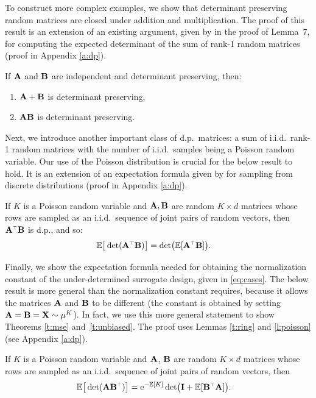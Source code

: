 \documentclass[11pt]{article}
\begin{document}
\noindent
To construct more complex examples, we show that determinant preserving random matrices are
closed under addition and multiplication. The proof of this result is
an extension of an existing argument, given by
\cite{determinantal-averaging} in the proof of Lemma~7, for computing
the expected determinant of the sum of rank-1 random matrices (proof in Appendix \ref{a:dp}).
\begin{lemma}\label{t:ring}
  If $\mathbf A$ and $\mathbf B$ are independent and determinant preserving, then:
  \vspace{-1mm}
  \begin{enumerate}
    \item $\mathbf A+\mathbf B$ is determinant preserving,
          \vspace{-2mm}
    \item $\mathbf A\mathbf B$ is determinant preserving.
  \end{enumerate}
\end{lemma}

\noindent
Next, we introduce another important class of d.p.~matrices:
a sum of i.i.d.~rank-1 random matrices with the number of
i.i.d.~samples being a Poisson random variable. Our use of the Poisson
distribution is crucial for the below result to hold. It is an
extension of an expectation formula given by \cite{dpp-intermediate}
for sampling from discrete distributions (proof in Appendix \ref{a:dp}).
\begin{lemma}\label{l:poisson}
  If $K$ is a Poisson random variable and $\mathbf A,\mathbf B$ are random $K\times d$
  matrices whose rows  are sampled as an i.i.d.~sequence of joint pairs of
  random vectors, then $\A^\top\B$ is d.p., and so:
  \begin{align*}
    \E\big[\det(\A^\top\B)\big] & = \det\!\big(\E[\A^\top\B]\big).
  \end{align*}
\end{lemma}

\noindent
Finally, we show the expectation formula needed for obtaining the
normalization constant of the under-determined surrogate design, given
in \eqref{eq:cases}.
The below result is more general than the normalization constant
requires, because it allows the matrices $\mathbf A$ and $\mathbf B$ to be different
(the constant is obtained by setting $\mathbf A=\mathbf B=\mathbf X\sim\mu^K$).
In fact, we use this more general statement to show Theorems
\ref{t:mse} and~\ref{t:unbiased}. The proof uses
Lemmas \ref{t:ring} and \ref{l:poisson} (see Appendix \ref{a:dp}).
\begin{lemma}\label{l:normalization}
  If $K$ is a Poisson random variable and $\mathbf A$, $\mathbf B$ are random $K\times d$
  matrices whose rows  are sampled as an i.i.d.~sequence of joint pairs of
  random vectors, then
  \begin{align*}
    \E\big[\det(\A\B^\top)\big] & = \ee^{-\E[K]}\det\!\big(\I + \E[\B^\top\A]\big).
  \end{align*}
\end{lemma}
\end{document}
